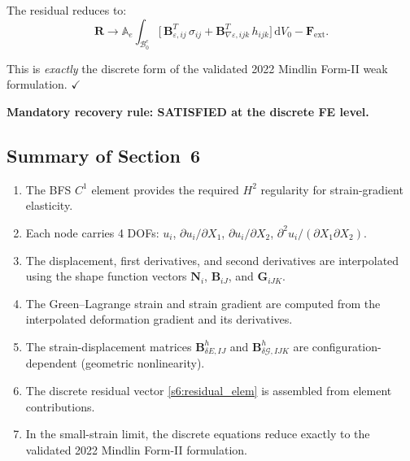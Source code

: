 \documentclass[11pt]{article}
\begin{document}
The residual reduces to:
\begin{equation}
\mathbf{R} \to \mathbb{A}_{e}
  \int_{\mathcal{B}_{0}^{e}}
  \bigl[\,\mathbf{B}_{\varepsilon,ij}^{T}\,\sigma_{ij}
  + \mathbf{B}_{\nabla\varepsilon,ijk}^{T}\,h_{ijk}
  \bigr]\,\mathrm{d}V_{0}
- \mathbf{F}_{\mathrm{ext}}.
\end{equation}

This is \emph{exactly} the discrete form of the validated 2022
Mindlin Form-II weak formulation. $\checkmark$

\textbf{Mandatory recovery rule: SATISFIED at the discrete FE level.}

\subsection{Summary of Section~6}
\label{ssec:section_summary}

\begin{enumerate}
\item The BFS $C^{1}$ element provides the required $H^{2}$ regularity
  for strain-gradient elasticity.

\item Each node carries 4 DOFs: $u_{i}$, $\partial u_{i}/\partial X_{1}$,
  $\partial u_{i}/\partial X_{2}$, $\partial^{2}u_{i}/(\partial X_{1}\partial X_{2})$.

\item The displacement, first derivatives, and second derivatives are
  interpolated using the shape function vectors $\mathbf{N}_{i}$,
  $\mathbf{B}_{iJ}$, and $\mathbf{G}_{iJK}$.

\item The Green--Lagrange strain and strain gradient are computed from
  the interpolated deformation gradient and its derivatives.

\item The strain-displacement matrices $\mathbf{B}_{\delta E,IJ}^{h}$ and
  $\mathbf{B}_{\delta\mathcal{G},IJK}^{h}$ are configuration-dependent
  (geometric nonlinearity).

\item The discrete residual vector \eqref{s6:residual_elem} is assembled
  from element contributions.

\item In the small-strain limit, the discrete equations reduce exactly
  to the validated 2022 Mindlin Form-II formulation.
\end{enumerate}
\end{document}
